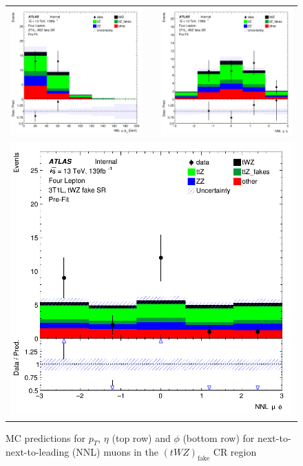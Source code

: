 \begin{figure}[htbp]
\centering
  \begin{tabular}{ccc}



    \includegraphics[width=.2\textwidth]{figures/PreFitPlots/lep4_tWZ_3T1L_NNL_mu_pt} & &
    \includegraphics[width=.2\textwidth]{figures/PreFitPlots/lep4_tWZ_3T1L_NNL_mu_eta}  \\
    \multicolumn{3}{c}{\includegraphics[width=.2\textwidth]{figures/PreFitPlots/lep4_tWZ_3T1L_NNL_mu_phi}}  \\
  \end{tabular}
    \caption{MC predictions for $p_{T}$, $\eta$ (top row) and $\phi$ (bottom row) for next-to-next-to-leading (NNL) muons in the $(tWZ)_{\text{fake}}$ CR region }
  \label{fig:4lep-3T1L-CR-muonPlots}
\end{figure}
\clearpage

